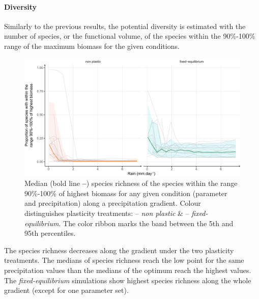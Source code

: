
\paragraph{Diversity}

Similarly to the previous results, the potential diversity is estimated with the number of species, or the functional volume, of the species within the 90\%-100\% range of the maximum biomass for the given conditions.

\begin{figure}
\includegraphics[width = \textwidth]{./2_PP/Figures/Rain/gradient_plot_spdiv10.pdf}
\caption[Species richness of the best performing species along a precipitation gradient]{Median (bold line \textbf{--}) species richness of the species within the range 90\%-100\% of highest biomass for any given condition (parameter and precipitation) along a precipitation gradient.  Colour distinguishes plasticity treatments: \textcolor{myOrange}{-- \textit{non plastic}} \&  \textcolor{myGreen}{-- \textit{fixed-equilibrium}}. The color ribbon marks the band between the 5th and 95th percentiles.}\label{fig:species_richness_grad} \end{figure}

The species richness decreases along the gradient under the two plasticity treatments. The medians of species richness reach the low point for the same precipitation values than the medians of the optimum reach the highest values. The \textit{fixed-equilibrium} simulations show highest species richness along the whole gradient (except for one parameter set).

